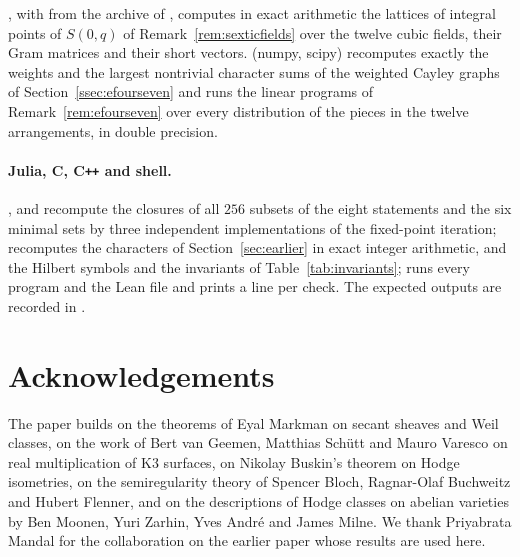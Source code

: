 \documentclass[11pt,reqno]{amsart}
\numberwithin{equation}{section}
\theoremstyle{plain}
\theoremstyle{definition}
\begin{document}
, with  from the archive of \cite{BMB26}, computes in exact arithmetic the lattices of integral points of $S(0,q)$ of Remark~\ref{rem:sexticfields} over the twelve cubic fields, their Gram matrices and their short vectors.  (numpy, scipy) recomputes exactly the weights and the largest nontrivial character sums of the weighted Cayley graphs of Section~\ref{ssec:efourseven} and runs the linear programs of Remark~\ref{rem:efourseven} over every distribution of the pieces in the twelve arrangements, in double precision.

\paragraph{Julia, C, C\texttt{++} and shell.} ,  and  recompute the closures of all $256$ subsets of the eight statements and the six minimal sets by three independent implementations of the fixed-point iteration;  recomputes the characters of Section~\ref{sec:earlier} in exact integer arithmetic, and  the Hilbert symbols and the invariants of Table~\ref{tab:invariants};  runs every program and the Lean file and prints a line per check. The expected outputs are recorded in .








\section*{Acknowledgements}
The paper builds on the theorems of Eyal Markman on secant sheaves and Weil classes, on the work of Bert van Geemen, Matthias Sch\"utt and Mauro Varesco on real multiplication of K3 surfaces, on Nikolay Buskin's theorem on Hodge isometries, on the semiregularity theory of Spencer Bloch, Ragnar-Olaf Buchweitz and Hubert Flenner, and on the descriptions of Hodge classes on abelian varieties by Ben Moonen, Yuri Zarhin, Yves Andr\'e and James Milne. We thank Priyabrata Mandal for the collaboration on the earlier paper \cite{BMB26} whose results are used here.
\end{document}
